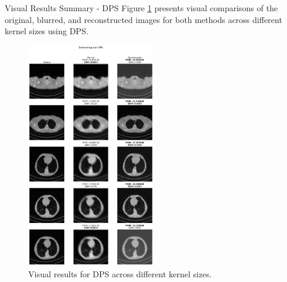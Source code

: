 \begin{frame}{Visual Results Summary - DPS}
    Figure \ref{fig:visual_results_dps} presents visual comparisons of the original, blurred, and reconstructed images for both methods across different kernel sizes using DPS.
    \begin{figure}
        \centering
        \includegraphics[width=0.5\textwidth]{media/deblurring_dps.png}
        \caption{Visual results for DPS across different kernel sizes.}
        \label{fig:visual_results_dps}
    \end{figure}

\end{frame}
